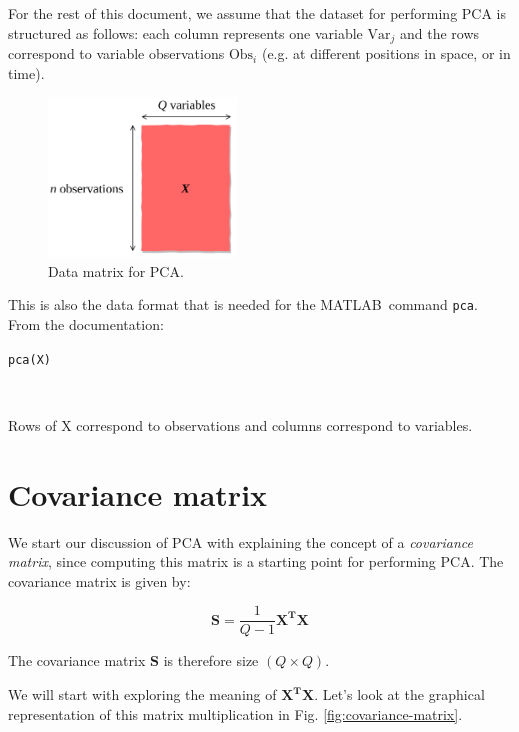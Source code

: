 \documentclass[10pt,twocolumn]{article}
\begin{document}
For the rest of this document, we assume that the dataset for performing PCA is structured as follows: each column represents one variable $\text{Var}_j$ and the rows correspond to variable observations $\text{Obs}_i$ (e.g. at different positions in space, or in time).

\begin{figure}[H]
\centering\includegraphics[width=5cm]{data-set-PCA.png}
\caption{Data matrix for PCA.}
\label{fig:data-matrix}
\end{figure}

This is also the data format that is needed for the MATLAB\textregistered \, command \texttt{pca}. From the documentation:


\begin{framed}
\texttt{pca(X)}

\,\,

Rows of X correspond to observations and columns correspond to variables.
\end{framed}

\section{Covariance matrix}

We start our discussion of PCA with explaining the concept of a \textit{covariance matrix}, since computing this matrix is a starting point for performing PCA. The covariance matrix is given by:

\begin{equation}
\bm{S} = \frac{1}{Q-1} \bm{X^T} \bm{X}
\end{equation}

The covariance matrix $\bm{S}$ is therefore size $(Q \times Q)$.

We will start with exploring the meaning of $\bm{X^T} \bm{X}$. Let's look at the graphical representation of this matrix multiplication in Fig. \ref{fig:covariance-matrix}.
\end{document}
